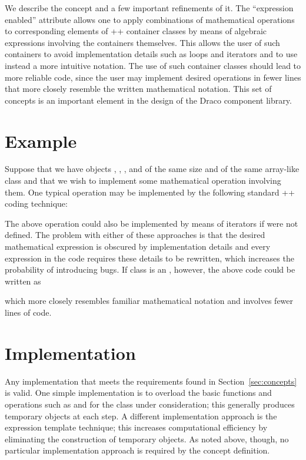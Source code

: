 \documentclass[11pt]{rnote}
\begin{document}
We describe the  concept and 
a few important refinements of it. The ``expression enabled''
attribute allows one to apply combinations of mathematical operations
to corresponding elements of \C++ container classes by means of
algebraic expressions involving the containers themselves. This allows 
the user of such containers to avoid implementation details such as
loops and iterators and to use instead a more intuitive notation. The
use of such container classes should lead to more reliable code, since 
the user may implement desired operations in fewer lines that more
closely resemble the written mathematical notation. This set of
concepts is an important element in the design of the Draco component
library.

\section{Example}

Suppose that we have objects , , , and
 of the same size and of the same array-like class
 and that we wish to implement some mathematical
operation involving them. One typical operation may be implemented by
the following standard \C++ coding technique:

\break
{}

The above operation could also be implemented by means of iterators if 
 were not defined. The problem with either of these
approaches is that the desired mathematical expression is obscured by
implementation details and every expression in the code requires these 
details to be rewritten, which increases the probability of
introducing bugs. If class  is an , however, the above code could be written as


which more closely resembles familiar mathematical notation and
involves fewer lines of code.

\section{Implementation}

Any implementation that meets the requirements found in
Section~\ref{sec:concepts} is valid. One simple implementation is to
overload the basic functions and operations such as  and
 for the class under consideration; this generally
produces temporary objects at each step. A different implementation
approach is the expression template technique\cite{fu97}\cite{ve95};
this increases computational efficiency by eliminating the
construction of temporary objects. As noted above, though, no
particular implementation approach is required by the concept
definition.
\end{document}

